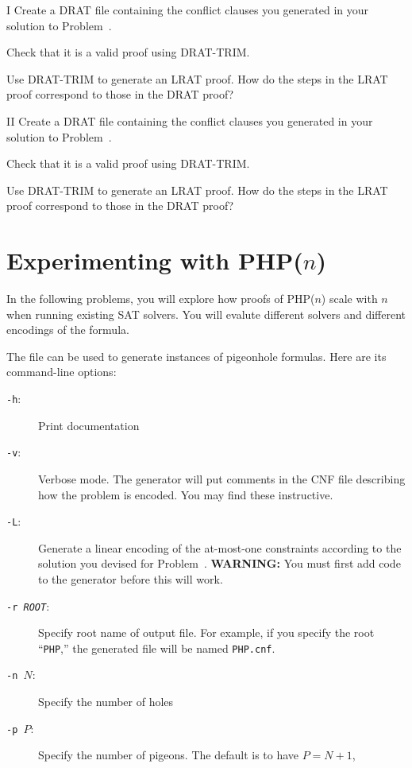\begin{problem}{I}
Create a DRAT file containing the conflict clauses you generated in your solution to Problem~.
\begin{choice}
\item
Check that it is a valid proof using DRAT-TRIM.
\item
Use DRAT-TRIM to generate an LRAT proof.  How do the steps in the LRAT proof correspond to those in the DRAT proof?
\end{choice}
\end{problem}

\begin{problem}{II}
Create a DRAT file containing the conflict clauses you generated in your solution to Problem~.
\begin{choice}
\item
Check that it is a valid proof using DRAT-TRIM.
\item
Use DRAT-TRIM to generate an LRAT proof.  How do the steps in the LRAT proof correspond to those in the DRAT proof?
\end{choice}
\end{problem}

\newpage

\section*{Experimenting with PHP($n$)}

In the following problems, you will explore how proofs of PHP($n$)
scale with $n$ when running existing SAT solvers.  You will evalute
different solvers and different encodings of the formula.

The file  can be used to generate
instances of pigeonhole formulas.  Here are its command-line options:
\begin{description}
\item[\texttt{-h}:] Print documentation
\item[\texttt{-v}:] Verbose mode.
  The generator will put comments in
  the CNF file describing how the problem is encoded.  You may find
  these instructive.
\item[\texttt{-L}:] Generate a linear encoding of the at-most-one
  constraints according to the solution you devised for
  Problem~.  {\bf WARNING:} You must first add code
  to the generator before this will work.
\item[\texttt{-r \textit{ROOT}}:]
  Specify root name of output file.  For example, if you specify the
  root ``\texttt{PHP},'' the generated file will be named
  \texttt{PHP.cnf}.
\item[\texttt{-n $N$}:]
  Specify the number of holes
\item[\texttt{-p $P$}:]
  Specify the number of pigeons.  The default is to have $P=N+1$,
\end{description}

